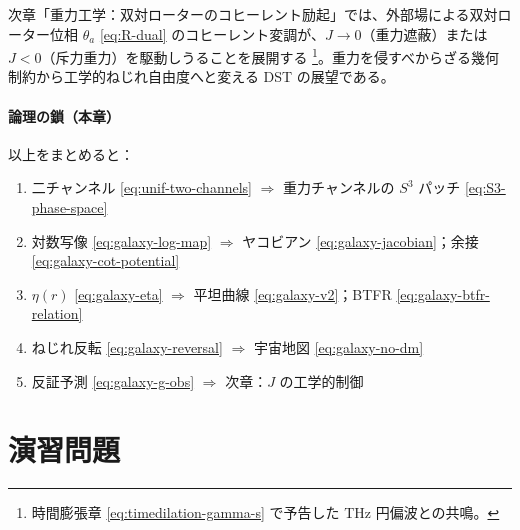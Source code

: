 \documentclass[dvipdfmx,a4paper,oneside]{jsbook}
\numberwithin{equation}{chapter}
\begin{document}
次章「重力工学：双対ローターのコヒーレント励起」では、外部場による双対ローター位相 \(\theta_a\) \eqref{eq:R-dual} のコヒーレント変調が、\(J \to 0\)（重力遮蔽）または \(J < 0\)（斥力重力）を駆動しうることを展開する \footnote{時間膨張章 \eqref{eq:timedilation-gamma-s} で予告した THz 円偏波との共鳴。}。重力を侵すべからざる幾何制約から工学的ねじれ自由度へと変える DST の展望である。

\paragraph{論理の鎖（本章）}
以上をまとめると：
\begin{enumerate}[leftmargin=2em]
  \item 二チャンネル \eqref{eq:unif-two-channels} \(\Rightarrow\) 重力チャンネルの \(S^3\) パッチ \eqref{eq:S3-phase-space}
  \item 対数写像 \eqref{eq:galaxy-log-map} \(\Rightarrow\) ヤコビアン \eqref{eq:galaxy-jacobian}；余接 \eqref{eq:galaxy-cot-potential}
  \item \(\eta(r)\) \eqref{eq:galaxy-eta} \(\Rightarrow\) 平坦曲線 \eqref{eq:galaxy-v2}；BTFR \eqref{eq:galaxy-btfr-relation}
  \item ねじれ反転 \eqref{eq:galaxy-reversal} \(\Rightarrow\) 宇宙地図 \eqref{eq:galaxy-no-dm}
  \item 反証予測 \eqref{eq:galaxy-g-obs} \(\Rightarrow\) 次章：\(J\) の工学的制御
\end{enumerate}

\section*{演習問題}
\end{document}
